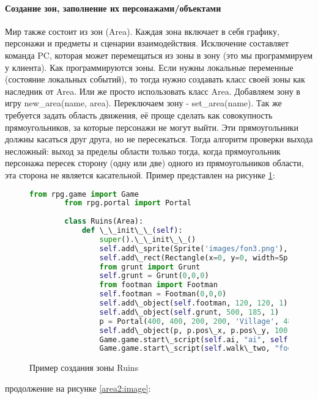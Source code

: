 \paragraph{Создание зон, заполнение их персонажами/объектами}
Мир также состоит из зон (Area). Каждая зона включает в себя графику, персонажи и предметы и сценарии взаимодействия. Исключение составляет команда PC, которая может перемещаться из зоны в зону (это мы программируем у клиента). Как программируются зоны. Если нужны локальные переменные (состояние локальных событий), то тогда нужно создавать класс своей зоны как наследник от Area. Или же просто использовать класс Area. Добавляем зону в игру new\_area(name, area). Переключаем зону - set\_area(name). Так же требуется задать область движения, её проще сделать как совокупность прямоугольников, за которые персонажи не могут выйти. Эти прямоугольники должны касаться друг друга, но не пересекаться. Тогда алгоритм проверки выхода несложный: выход за пределы области только тогда, когда прямоугольник персонажа пересек сторону (одну или две) одного из прямоугольников области, эта сторона не является касательной.
Пример представлен на рисунке \ref{area:image}:
\begin{figure}[H]
	\begin{lstlisting}[language=Python]
		from rpg.game import Game
		from rpg.portal import Portal
		
		class Ruins(Area):
			def \_\_init\_\_(self):
				super().\_\_init\_\_()
				self.add\_sprite(Sprite('images/fon3.png'), 590, 400, 0)
				self.add\_rect(Rectangle(x=0, y=0, width=Sprite('images/fon3.png').image.width(),\\ height=Sprite('images/fon3.png').image.height()))
				from grunt import Grunt
				self.grunt = Grunt(0,0,0)
				from footman import Footman
				self.footman = Footman(0,0,0)
				self.add\_object(self.footman, 120, 120, 1)
				self.add\_object(self.grunt, 500, 185, 1)
				p = Portal(400, 400, 200, 200, 'Village', 480, 100)
				self.add\_object(p, p.pos\_x, p.pos\_y, 100)
				Game.game.start\_script(self.ai, "ai", self.grunt)
				Game.game.start\_script(self.walk\_two, "footman", 50, 50)		
	\end{lstlisting}  
\caption{Пример создания зоны Ruins}
\label{area:image}
\end{figure}
продолжение на рисунке \ref{area2:image}:

